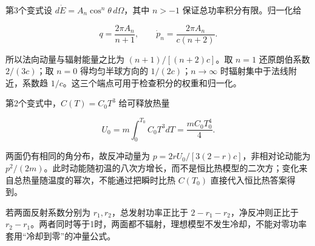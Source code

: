 \documentclass[12pt,a4paper,UTF8]{ctexart}
\begin{document}
第3个变式设 \(d\dot E=A_n\cos^n\theta\,d\Omega\)，其中 \(n>-1\)
保证总功率积分有限。归一化给

\[q=\frac{2\pi A_n}{n+1},\qquad \dot p_n=\frac{2\pi A_n}{c(n+2)}.\]

所以法向动量与辐射能量之比为 \((n+1)/[(n+2)c]\)。取 \(n=1\) 还原朗伯系数
\(2/(3c)\)；取 \(n=0\) 得均匀半球方向的 \(1/(2c)\)；\(n\to\infty\)
时辐射集中于法线附近，系数趋
\(1/c\)。这三个端点可用于检查积分的权重和归一化。

第2个变式中，\(C(T)=C_0T^3\) 给可释放热量

\[U_0=m\int_0^{T_0}C_0T^3dT=\frac{mC_0T_0^4}{4}.\]

两面仍有相同的角分布，故反冲动量为 \(p=2rU_0/[3(2-r)c]\)，非相对论动能为
\(p^2/(2m)\)。此时动能随初温的八次方增长，而不是恒比热模型的二次方；变化来自总热量随温度的幂次，不能通过把瞬时比热
\(C(T_0)\) 直接代入恒比热答案得到。

若两面反射系数分别为 \(r_1,r_2\)，总发射功率正比于
\(2-r_1-r_2\)，净反冲则正比于
\(r_2-r_1\)。两者同时等于1时，两面都不辐射，理想模型不发生冷却，不能对零功率套用``冷却到零''的冲量公式。
\end{document}
